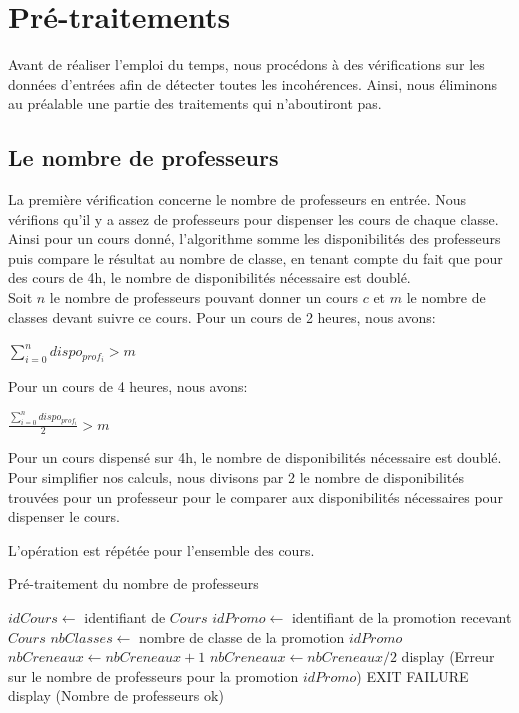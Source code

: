
\section{Pré-traitements}
Avant de réaliser l'emploi du temps, nous procédons à des vérifications sur les données d'entrées afin de détecter toutes les incohérences. Ainsi, nous éliminons au préalable une partie des traitements qui n'aboutiront pas.

\subsection{Le nombre de professeurs}
La première vérification concerne le nombre de professeurs en entrée. Nous vérifions qu'il y a assez de professeurs pour dispenser les cours de chaque classe.
Ainsi pour un cours donné, l'algorithme somme les disponibilités des professeurs puis compare le résultat au nombre de classe, en tenant compte du fait que pour des cours de 4h, le nombre de disponibilités nécessaire est doublé.\\

Soit $n$ le nombre de professeurs pouvant donner un cours $c$ et $m$ le nombre de classes devant suivre ce cours.
Pour un cours de 2 heures, nous avons:
\begin{center}
$\sum_{i=0}^n dispo_{prof_i} > m$
\end{center}

Pour un cours de 4 heures, nous avons: 
\begin{center}
$\frac{\sum_{i=0}^n dispo_{prof_i}}{2} > m$
\end{center}

Pour un cours dispensé sur 4h, le nombre de disponibilités nécessaire est doublé. Pour simplifier nos calculs, nous divisons par 2 le nombre de disponibilités trouvées pour un professeur pour le comparer aux disponibilités nécessaires pour dispenser le cours.

L'opération est répétée pour l'ensemble des cours. 

\newpage

\begin{algorithm}
\caption{Pré-traitement du nombre de professeurs}
\begin{algorithmic}
\STATE $idCours \leftarrow$ identifiant de $Cours$
\STATE $idPromo \leftarrow$ identifiant de la promotion recevant $Cours$
\STATE $nbClasses \leftarrow$ nombre de classe de la promotion $idPromo$
\STATE $nbCreneaux \leftarrow nbCreneaux + 1$
\ENDIF
\ENDFOR
\ENDIF
\ENDFOR
{}
\STATE $nbCreneaux \leftarrow nbCreneaux / 2$
\ENDIF
{}
\STATE display (Erreur sur le nombre de professeurs pour la promotion $idPromo$)
\STATE EXIT FAILURE
\ENDIF
\ENDFOR
\STATE display (Nombre de professeurs ok)
\end{algorithmic}
\end{algorithm}

